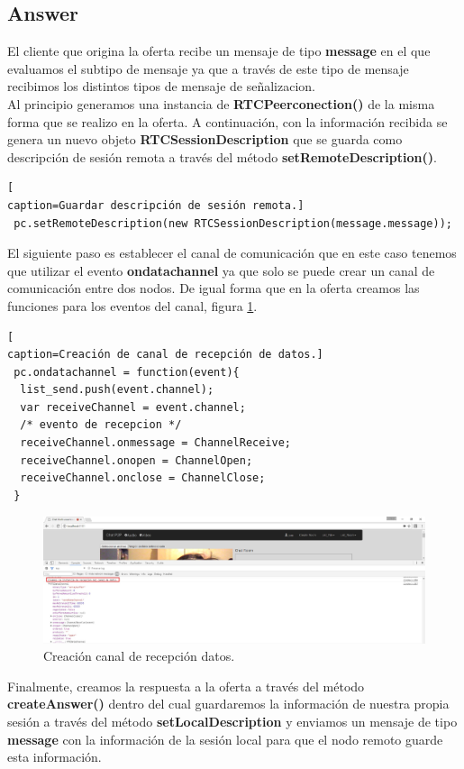 \subsection*{Answer}
El cliente que origina la oferta recibe un mensaje de tipo \textbf{message} en el que evaluamos el subtipo de mensaje ya que a través de este tipo de mensaje recibimos los distintos tipos de mensaje de señalizacion.
\\Al principio generamos una instancia de \textbf{RTCPeerconection()} de la misma forma que se realizo en la oferta. A continuación, con la información recibida se genera un nuevo objeto \textbf{RTCSessionDescription} que se guarda como descripción de sesión remota a través del método \textbf{setRemoteDescription()}. 
\begin{lstlisting}[
caption=Guardar descripción de sesión remota.]
 pc.setRemoteDescription(new RTCSessionDescription(message.message));
\end{lstlisting}
El siguiente paso es establecer el canal de comunicación que en este caso tenemos que utilizar el evento \textbf{ondatachannel} ya que solo se puede crear un canal de comunicación entre dos nodos. De igual forma que en la oferta creamos las funciones para los eventos del canal, figura \ref{fig:DataChannelAnswer}. 
\begin{lstlisting}[
caption=Creación de canal de recepción de datos.]
 pc.ondatachannel = function(event){
  list_send.push(event.channel);
  var receiveChannel = event.channel;
  /* evento de recepcion */
  receiveChannel.onmessage = ChannelReceive;
  receiveChannel.onopen = ChannelOpen;
  receiveChannel.onclose = ChannelClose;
 }
\end{lstlisting}
\begin{figure}[!h]
\centering
\includegraphics[width=0.8\linewidth]{Figures/DataChannelAnswer}
\decoRule
\caption[Creación canal de recepción datos.]{Creación canal de recepción datos.}
\label{fig:DataChannelAnswer}
\end{figure}
Finalmente, creamos la respuesta a la oferta a través del método \textbf{createAnswer()} dentro del cual guardaremos la información de nuestra propia sesión a través del método \textbf{setLocalDescription} y enviamos un mensaje de tipo \textbf{message} con la información de la sesión local para que el nodo remoto guarde esta información.

